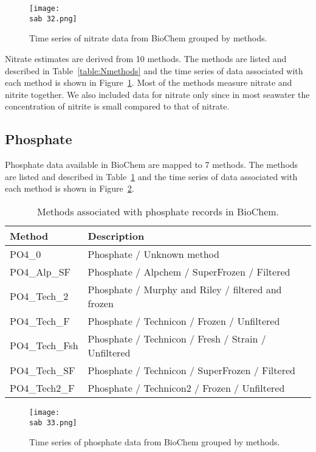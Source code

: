 \documentclass[letterpaper,portrait,11pt]{scrartcl}
\numberwithin{equation}{section}		%
\numberwithin{figure}{section}		%
\numberwithin{table}{section}				%
\newcommand{\ecomod}{\string~/ecomod_data/}   %
\newcommand{\sab}{\ecomod/mpa/sab/}   %
\begin{document}
\begin{appendices}
\begin{figure}[h]
  \label{fig:NTimeseries}
  \centering
  \texttt{[image: \\sab 32.png]}
  \caption{Time series of nitrate data from BioChem grouped by methods.}
\end{figure}

Nitrate estimates are derived from 10 methods. The methods are listed and described in Table~\ref{table:Nmethods} and the time series of data associated with each method is shown in Figure~\ref{fig:NTimeseries}. Most of the methods measure nitrate and nitrite together. We also included data for nitrate only since  in most seawater the concentration of nitrite is small compared to that of nitrate.

\clearpage
\subsection{Phosphate}

Phosphate  data available in BioChem are mapped to 7 methods. The methods are listed and described in Table~\ref{table:PhosphateMethods} and the time series of data associated with each method is shown in Figure~\ref{fig:PhosphateTimeseries}.

\begin{table}[h]
  \caption{Methods associated with phosphate records in BioChem.}
  \label{table:PhosphateMethods}
  \begin{tabular}{ll}
    Method & Description \\ \hline
    PO4\_0 & Phosphate / Unknown method  \\ 
    PO4\_Alp\_SF & Phosphate / Alpchem / SuperFrozen / Filtered \\ 
    PO4\_Tech\_2 & Phosphate / Murphy and Riley / filtered and frozen \\ 
    PO4\_Tech\_F & Phosphate / Technicon / Frozen / Unfiltered \\ 
    PO4\_Tech\_Fsh & Phosphate / Technicon / Fresh / Strain / Unfiltered \\
    PO4\_Tech\_SF & Phosphate / Technicon / SuperFrozen / Filtered \\
    PO4\_Tech2\_F & Phosphate / Technicon2 / Frozen / Unfiltered \\
  \end{tabular}
\end{table}


\begin{figure}[h]
  \centering
  \texttt{[image: \\sab 33.png]}
  \caption{Time series of phosphate data from BioChem grouped by methods.}
  \label{fig:PhosphateTimeseries}
\end{figure}



\end{appendices}
\end{document}

